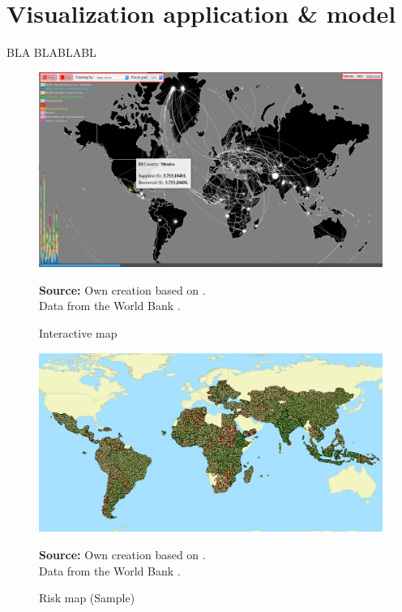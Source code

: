 \chapter{Visualization application \& model}\label{chap_vis}

BLA BLABLABL

\newpage


\begin{figure}[H]
\begin{center}
\caption{Interactive map}
\label{fig_interactive_map}
\includegraphics[width=\textwidth,height=1\textheight,keepaspectratio]{../img/interactive_map_mex.pdf}
\end{center}
\noindent \footnotesize{\textbf{Source:} Own creation based on \cite{wb_i_map}. \\Data from the World Bank \parencite{wb_data}.}
\end{figure}





\begin{figure}[H]
\begin{center}
\caption{Risk map (Sample)}
\label{fig_risk_map}
\includegraphics[width=\textwidth,height=1\textheight,keepaspectratio]{../img/risk_map.pdf}
\end{center}
\noindent \footnotesize{\textbf{Source:} Own creation based on \cite{wb_i_map}. \\Data from the World Bank \parencite{wb_data}.}
\end{figure}


